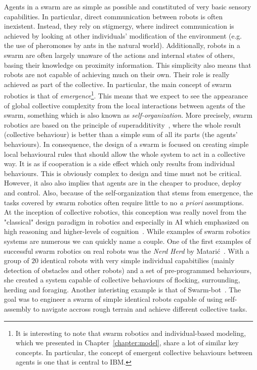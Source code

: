     Agents in a swarm are as simple as possible and constituted of very basic sensory capabilities. In particular, direct communication between robots is often inexistent. Instead, they rely on stigmergy, where indirect communication is achieved by looking at other individuals' modification of the environment (e.g. the use of pheromones by ants in the natural world). Additionally, robots in a swarm are often largely unaware of the actions and internal states of others, basing their knowledge on proximity information. This simplicity also means that robots are not capable of achieving much on their own. Their role is really achieved as part of the collective. In particular, the main concept of swarm robotics is that of \emph{emergence}\footnote{It is interesting to note that swarm robotics and individual-based modeling, which we presented in Chapter~\ref{chapter:model}, share a lot of similar key concepts. In particular, the concept of emergent collective behaviours between agents is one that is central to IBM.}. This means that we expect to see the appearance of global collective complexity from the local interactions between agents of the swarm, something which is also known as \emph{self-organization}. More precisely, swarm robotics are based on the principle of superadditivity~\parencite{Parker2008}, where the whole result (collective behaviour) is better than a simple sum of all its parts (the agents' behaviours). In consequence, the design of a swarm is focused on creating simple local behavioural rules that should allow the whole system to act in a collective way. It is as if cooperation is a side effect which only results from individual behaviours. This is obviously complex to design and time must not be critical. However, it also also implies that agents are in the cheaper to produce, deploy and control. Also, because of the self-organization that stems from emergence, the tasks covered by swarm robotics often require little to no \emph{a priori} assumptions. At the inception of collective robotics, this conception was really novel from the "classical" design paradigm in robotics and especially in AI which emphasized on high reasoning and higher-levels of cognition~\parencite{Bonabeau1999}. While examples of swarm robotics systems are numerous we can quickly name a couple. One of the first examples of successful swarm robotics on real robots was the \emph{Nerd Herd} by Matarić~\parencite{Mataric1995}. With a group of $20$ identical robots with very simple individual capabitilies (mainly detection of obstacles and other robots) and a set of pre-programmed behaviours, she created a system capable of collective behaviours of flocking, surrounding, herding and foraging. Another interisting example is that of Swarm-bot~\parencite{Mondada2004, Dorigo2004, Mondada2005}. The goal was to engineer a swarm of simple identical robots capable of using self-assembly to navigate accross rough terrain and achieve different collective tasks.


